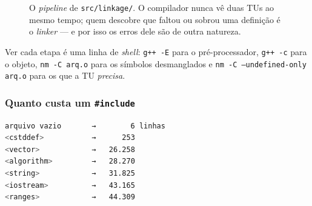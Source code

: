 \begin{figure}[htbp]
\centering
{}
\caption{O \emph{pipeline} de \texttt{src/linkage/}. O compilador nunca vê duas
         TUs ao mesmo tempo; quem descobre que faltou ou sobrou uma definição é
         o \emph{linker} --- e por isso os erros dele são de outra natureza.}
\label{fig:tu-pipeline}
\end{figure}

Ver cada etapa é uma linha de \emph{shell}: \texttt{g++ -E} para o
pré-processador, \texttt{g++ -c} para o objeto, \texttt{nm -C arq.o} para os
símbolos desmanglados e \texttt{nm -C --undefined-only arq.o} para os que a TU
\emph{precisa}.

\subsubsection{Quanto custa um \texttt{\#include}}

\begin{lstlisting}[style=bt, language=bash,
    caption={Saída de \texttt{src/linkage/}: linhas depois do pré-processador,
             GCC 13.3 com \texttt{-std=c++20}.}]
arquivo vazio       →        6 linhas
<cstddef>           →      253
<vector>            →   26.258
<algorithm>         →   28.270
<string>            →   31.825
<iostream>          →   43.165
<ranges>            →   44.309
\end{lstlisting}

